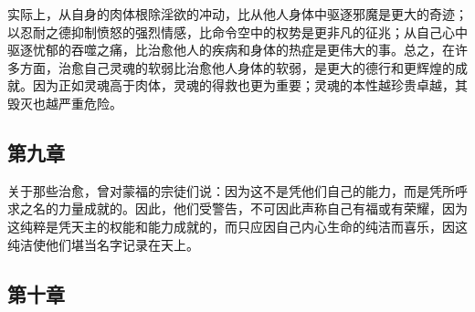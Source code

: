 \par

实际上，从自身的肉体根除淫欲的冲动，比从他人身体中驱逐邪魔是更大的奇迹；以忍耐之德抑制愤怒的强烈情感，比命令空中的权势是更非凡的征兆；从自己心中驱逐忧郁的吞噬之痛，比治愈他人的疾病和身体的热症是更伟大的事。总之，在许多方面，治愈自己灵魂的软弱比治愈他人身体的软弱，是更大的德行和更辉煌的成就。因为正如灵魂高于肉体，灵魂的得救也更为重要；灵魂的本性越珍贵卓越，其毁灭也越严重危险。\par


\subsection{第九章}

\par

关于那些治愈，曾对蒙福的宗徒们说：因为这不是凭他们自己的能力，而是凭所呼求之名的力量成就的。因此，他们受警告，不可因此声称自己有福或有荣耀，因为这纯粹是凭天主的权能和能力成就的，而只应因自己内心生命的纯洁而喜乐，因这纯洁使他们堪当名字记录在天上。\par


\subsection{第十章}

\par

